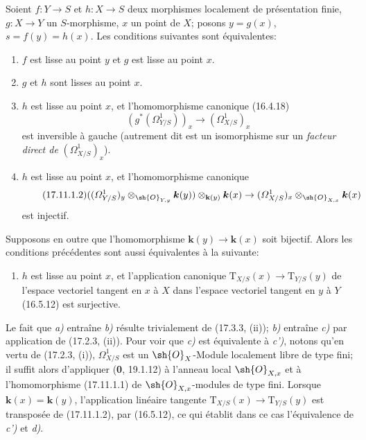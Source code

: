 \begin{theorem}[17.11.1]
\label{IV.17.11.1}
Soient $f:Y\to S$ et $h:X\to S$ deux morphismes localement de présentation finie, $g:X\to Y$ un $S$-morphisme, $x$ un point de $X$; posons $y=g(x)$, $s=f(y)=h(x)$. Les conditions suivantes sont équivalentes:
\begin{enumerate}
  \item[\textup{a)}] $f$ est lisse au point $y$ et $g$ est lisse au point $x$.
  \item[\textup{b)}] $g$ et $h$ sont lisses au point $x$.
  \item[\textup{c)}] $h$ est lisse au point $x$, et l'homomorphisme canonique \textup{(16.4.18)}
  \begin{equation}
  \label{IV.17.11.1.1}
  \tag{17.11.1.1}
  (g^*(\varOmega^1_{Y/S}))_x\to(\varOmega^1_{X/S})_x
  \end{equation}
  est inversible à gauche \textup{(autrement dit est un isomorphisme sur un \emph{facteur direct de} $(\varOmega^1_{X/S})_x$)}.
  \item[\textup{c$'$)}] $h$ est lisse au point $x$, et l'homomorphisme canonique
  \begin{equation}
  \label{IV.17.11.1.2}
  \tag{17.11.1.2}
  ((\varOmega^1_{Y/S})_y\otimes_{\sh{O}_{Y,y}}\boldsymbol{k}(y))\otimes_{\mathbf{k}(y)}\boldsymbol{k}(x)\to(\varOmega^1_{X/S})_x\otimes_{\sh{O}_{X,x}}\boldsymbol{k}(x)
  \end{equation}
  est injectif.
\end{enumerate}

Supposons en outre que l'homomorphisme $\boldsymbol{k}(y)\to\boldsymbol{k}(x)$ soit bijectif. Alors les conditions précédentes sont aussi équivalentes à la suivante:
\begin{enumerate}
  \item[\textup{d)}] $h$ est lisse au point $x$, et l'application canonique $\mathrm{T}_{X/S}(x)\to\mathrm{T}_{Y/S}(y)$ de l'espace vectoriel tangent en $x$ à $X$ dans l'espace vectoriel tangent en $y$ à $Y$ \textup{(16.5.12)} est surjective.
\end{enumerate}
\end{theorem}

Le fait que \emph{a)} entraîne \emph{b)} résulte trivialement de (17.3.3, (ii)); \emph{b)} entraîne \emph{c)} par application de (17.2.3, (ii)). Pour voir que \emph{c)} est équivalente à \emph{c')}, notons qu'en vertu de (17.2.3, (i)), $\varOmega^1_{X/S}$ est un $\sh{O}_X$-Module localement libre de type fini; il suffit alors d'appliquer (\textbf{0}, 19.1.12) à l'anneau local $\sh{O}_{X,x}$ et à l'homomorphisme (17.11.1.1) de $\sh{O}_{X,x}$-modules de type fini. Lorsque $\boldsymbol{k}(x)=\boldsymbol{k}(y)$, l'application linéaire tangente $\mathrm{T}_{X/S}(x)\to\mathrm{T}_{Y/S}(y)$ est transposée de (17.11.1.2), par (16.5.12), ce qui établit dans ce cas l'équivalence de \emph{c')} et \emph{d)}.

